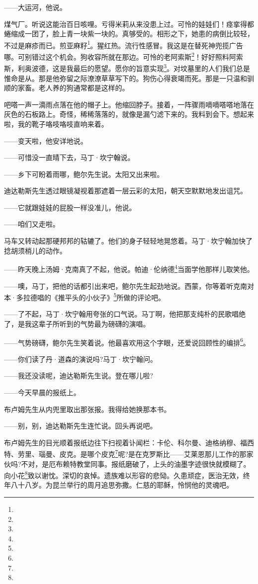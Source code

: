 \par ——大运河，他说。
\par 煤气厂。听说这能治百日咳哩。亏得米莉从来没患上过。可怜的娃娃们！痉挛得都蜷缩成一团了，脸上青一块紫一块的。真够受的。相形之下，她患的病倒比较轻，不过是麻疹而已。煎亚麻籽\footnote{}。猩红热。流行性感冒。我这是在替死神兜揽广告哪。可别错过这个机会。狗收容所就在那边。可怜的老阿索斯\footnote{}！好好照料阿索斯，利奥波德，这是我最后的愿望。愿你的旨意实现\footnote{}。对坟墓里的人们我们总是惟命是从。那是他弥留之际潦潦草草写下的。狗伤心得衰竭而死。那是一只温和驯顺的家畜。老人养的狗通常都是这样的。
\par 吧嗒一声一滴雨点落在他的帽子上。他缩回脖子。接着，一阵骤雨嘀嘀嗒嗒地落在灰色的石板路上。奇怪，稀稀落落的，就像是漏勺滤下来的。我料到会下。想起来啦，我的靴子咯吱咯吱直响来着。
\par ——变天啦，他安详地说。
\par ——可惜没一直晴下去，马丁·坎宁翰说。
\par ——乡下可盼着雨哪，鲍尔先生说。太阳又出来啦。
\par 迪达勒斯先生透过眼镜凝视着那遮着一层云彩的太阳，朝天空默默地发出诅咒。
\par ——它就跟娃娃的屁股一样没准儿，他说。
\par ——咱们又走啦。
\par 马车又转动起那硬邦邦的轱辘了。他们的身子轻轻地晃悠着。马丁·坎宁翰加快了捻胡须梢儿的动作。
\par ——昨天晚上汤姆·克南真了不起，他说。帕迪·伦纳德\footnote{}当面学他那样儿取笑他。
\par ——噢，马丁，把他的话都引出来吧，鲍尔先生起劲地说。西蒙，你等着听克南对本·多拉德唱的《推平头的小伙子》\footnote{}所做的评论吧。
\par ——了不起，马丁·坎宁翰用夸张的口气说。马丁啊，他把那支纯朴的民歌唱绝了，是我这辈子所听到的气势最为磅礴的演唱。
\par ——气势磅礴，鲍尔先生笑着说。他最喜欢用这个字眼，还爱说回顾性的编排\footnote{}。
\par ——你们读了丹·道森的演说吗?马丁·坎宁翰问。
\par ——我还没读呢，迪达勒斯先生说。登在哪儿啦?
\par ——今天早晨的报纸上。
\par 布卢姆先生从内兜里取出那张报。我得给她换那本书。
\par ——别，别，迪达勒斯先生连忙说。回头再说吧。
\par 布卢姆先生的目光顺着报纸边往下扫视着讣闻栏：卡伦、科尔曼、迪格纳穆、福西特、劳里、瑙曼、皮克。是哪个皮克\footnote{}呢?是在克罗斯比——艾莱恩那儿工作的那家伙吗?不对，是厄布赖特教堂同事。报纸磨破了，上头的油墨字迹很快就模糊了。向小花\footnote{}致以谢忱。深切的哀悼。遗族难以形容的悲恸。久患顽症，医治无效，终年八十八岁。为昆兰举行的周月追思弥撒。仁慈的耶稣，怜悯他的灵魂吧。
